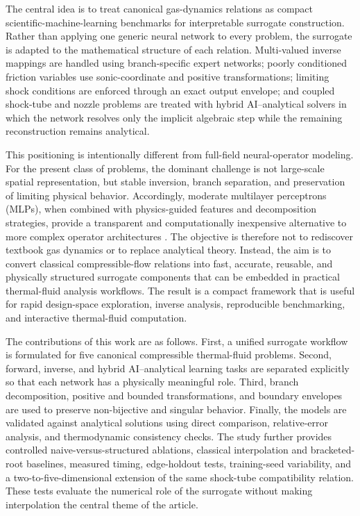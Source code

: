 \documentclass[preprint,12pt]{elsarticle}
\newcommand{\rev}[1]{#1}
\newcommand{\rev}[1]{\textcolor{revisionblue}{#1}}
\begin{document}
The central idea is to treat canonical gas-dynamics relations as compact scientific-machine-learning benchmarks for interpretable surrogate construction. Rather than applying one generic neural network to every problem, the surrogate is adapted to the mathematical structure of each relation. Multi-valued inverse mappings are handled using branch-specific expert networks; poorly conditioned friction variables use sonic-coordinate and positive transformations; limiting shock conditions are enforced through an exact output envelope; and coupled shock-tube and nozzle problems are treated with hybrid AI--analytical solvers in which the network resolves only the implicit algebraic step while the remaining reconstruction remains analytical.

This positioning is intentionally different from full-field neural-operator modeling. For the present class of problems, the dominant challenge is not large-scale spatial representation, but stable inversion, branch separation, and preservation of limiting physical behavior. Accordingly, moderate multilayer perceptrons (MLPs), when combined with physics-guided features and decomposition strategies, provide a transparent and computationally inexpensive alternative to more complex operator architectures \cite{Goodfellow,XPINN,gPINN}. The objective is therefore not to rediscover textbook gas dynamics or to replace analytical theory. Instead, the aim is to convert classical compressible-flow relations into fast, accurate, reusable, and physically structured surrogate components that can be embedded in practical thermal-fluid analysis workflows. The result is a compact framework that is useful for rapid design-space exploration, inverse analysis, reproducible benchmarking, and interactive thermal-fluid computation.

The contributions of this work are as follows. First, a unified surrogate workflow is formulated for five canonical compressible thermal-fluid problems. Second, forward, inverse, and hybrid AI--analytical learning tasks are separated explicitly so that each network has a physically meaningful role. Third, branch decomposition, \rev{positive and bounded transformations}, and boundary \rev{envelopes} are used to preserve non-bijective and singular behavior. Finally, the models are validated against analytical solutions using direct comparison, relative-error analysis, and thermodynamic consistency checks. \rev{The study further provides controlled naive-versus-structured ablations, classical interpolation and bracketed-root baselines, measured timing, edge-holdout tests, training-seed variability, and a two-to-five-dimensional extension of the same shock-tube compatibility relation. These tests evaluate the numerical role of the surrogate without making interpolation the central theme of the article.}
\end{document}
